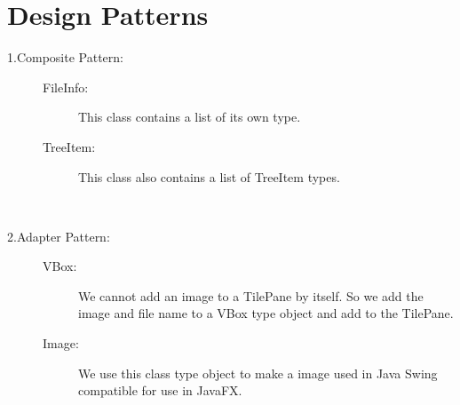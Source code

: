 \documentclass{article}
\begin{document}
	\section*{Design Patterns}
	\begin{description}
		\item[1.Composite Pattern:] \hfill \break
		\begin{description}
			\item[FileInfo:] This class contains a list of its own type.
			\item[TreeItem:] This class also contains a list of TreeItem types.
		\end{description}
		~\\
		\item[2.Adapter Pattern:] \hfill \break
		\begin{description}
			\item[VBox:] We cannot add an image to a TilePane by itself. So we add the image and file name to a VBox type object and add to the TilePane.
			\item[Image:] We use this class type object to make a image used in Java Swing compatible for use in JavaFX.
		\end{description}
	\end{description}	
\end{document}
